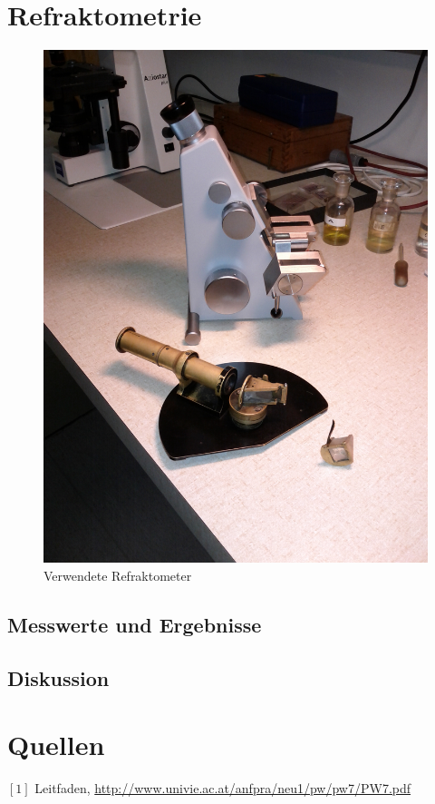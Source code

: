 \documentclass[12pt,a4paper]{article}
\begin{document}
\begin{multicols}{2}
\section{Refraktometrie}

\begin{figure}[H]
	\centering
	\includegraphics[angle=-90,scale=0.11]{./figure/refrakto.jpg}
	\caption{Verwendete Refraktometer}
	\label{fig:geraete_refrakto}
\end{figure}

\subsection{Messwerte und Ergebnisse}


\subsection{Diskussion}


\section{Quellen}
$[1]$ Leitfaden, \url{http://www.univie.ac.at/anfpra/neu1/pw/pw7/PW7.pdf}\\

\end{multicols}
\end{document}
